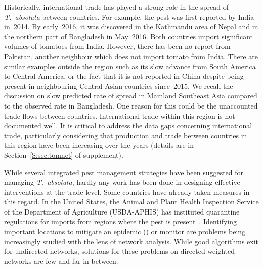 \documentclass[11pt]{article}
\newcommand{\tuta}{\emph{T.~absoluta}}
\theoremstyle{definition}
\begin{document}
Historically, international trade has played a strong role in the spread of
\tuta{} between countries. For example, the pest was first reported by
India in~2014. By early~2016, it was discovered in the Kathmandu area of
Nepal and in the northern part of Bangladesh in May~2016. Both countries import
significant volumes of tomatoes from India. However, there has been no report
from Pakistan, another neighbour which does not import tomato from India.
There are similar examples outside the region such as its slow advance from
South America to Central America, or the fact that it is not reported in
China despite being present in neighbouring Central Asian countries
since~2015.  We recall the discussion on slow predicted rate of spread in
Mainland Southeast Asia compared to the observed rate in Bangladesh. One
reason for this could be the unaccounted trade flows between countries.
International trade within this region is not documented well.  It is
critical to address the data gaps concerning international trade,
particularly considering that production and trade between countries in
this region have been increasing over the years (details are in
Section~\ref{S:sec:tomnet} of supplement).

While several integrated pest management strategies have been suggested for
managing \tuta{}, hardly any work has been done in designing effective
interventions at the trade level. Some countries have already taken
measures in this regard. In the United States, the Animal and Plant Health
Inspection Service of the Department of Agriculture (USDA-APHIS) has
instituted quarantine regulations for imports from regions where the pest
is present~\cite{USDA2012}. Identifying important locations to mitigate an
epidemic (\cite{banks2015role,kiss2006network,pautasso2010disease}) or
monitor are problems being increasingly studied with the lens of network
analysis.  While good algorithms exit for undirected networks, solutions
for these problems on directed weighted networks are few and far in
between.


\end{document}
